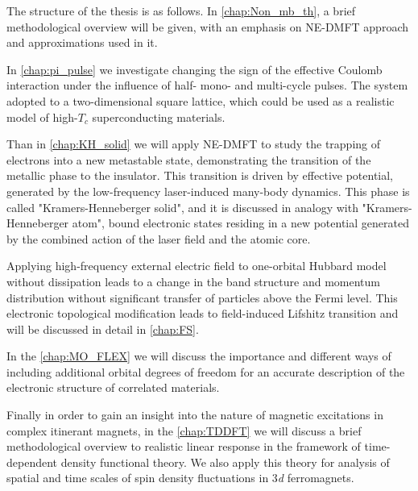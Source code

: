 The structure of the thesis is as follows. 
In \autoref{chap:Non_mb_th}, a brief methodological overview will be given, with an emphasis on NE-DMFT approach and approximations used in it.

In \autoref{chap:pi_pulse} we investigate changing the sign of the effective Coulomb interaction under the influence of half- mono- and multi-cycle pulses. The system adopted to a two-dimensional square lattice, which could be used as a realistic model of high-$T_c$ superconducting materials.

Than in \autoref{chap:KH_solid} we will apply NE-DMFT to study the trapping of electrons into a new metastable state, demonstrating the transition of the metallic phase to the insulator. This transition is driven by effective potential, generated by the low-frequency laser-induced many-body dynamics. This phase is called "Kramers-Henneberger solid", and it is  discussed in analogy with "Kramers-Henneberger atom", bound electronic states residing in a new potential generated by the combined action of the laser field and the atomic core.

Applying high-frequency external electric field to one-orbital Hubbard model without dissipation leads to a change in the band structure and momentum distribution without significant transfer of particles above the Fermi level. This electronic topological modification leads to field-induced Lifshitz transition and will be discussed in detail in \autoref{chap:FS}. 

In the \autoref{chap:MO_FLEX} we will discuss the importance and different ways of including additional orbital degrees of freedom for an accurate description of the electronic structure of correlated materials.

Finally in order to gain an insight into the nature of magnetic excitations in complex itinerant magnets, in the \autoref{chap:TDDFT} we will discuss a brief methodological overview to realistic linear response in the framework of time-dependent density functional theory. We also apply this theory for analysis of spatial and time scales of spin density fluctuations in 3\emph{d} ferromagnets.







\FloatBarrier
